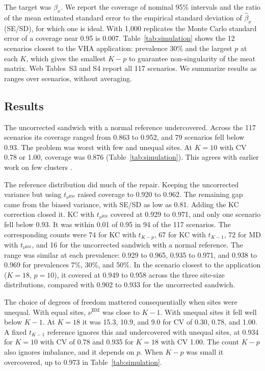 \documentclass[12pt]{article}
\theoremstyle{remark}
\begin{document}
The target was $\beta_x$. We report the coverage of nominal 95\% intervals and
the ratio of the mean estimated standard error to the empirical standard
deviation of $\widehat\beta_x$ (SE/SD), for which one is ideal. With 1{,}000
replicates the Monte Carlo standard error of a coverage near 0.95 is 0.007.
Table~\ref{tab:simulation} shows the 12 scenarios closest to the VHA
application: prevalence 30\% and the largest $p$ at each $K$, which gives the
smallest $K-p$ to guarantee non-singularity of the meat matrix. Web Tables~S3 and S4 report all 117 scenarios. We summarize
results as ranges over scenarios, without averaging.

\subsection{Results}
\label{sec:simresults}

The uncorrected sandwich with a normal reference undercovered. Across the 117
scenarios its coverage ranged from 0.863 to 0.952, and 79 scenarios fell below
0.93. The problem was worst with few and unequal sites. At $K=10$ with CV 0.78 or
1.00, coverage was 0.876 (Table~\ref{tab:simulation}). This agrees with earlier
work on few clusters \citep{mancl2001covariance,liredden2015sandwich}.

The reference distribution did much of the repair. Keeping the uncorrected
variance but using $t_{\nu^{\mathrm{BM}}}$ raised coverage to 0.920 to 0.962. The
remaining gap came from the biased variance, with SE/SD as low as 0.81. Adding
the KC correction closed it. KC with $t_{\nu^{\mathrm{BM}}}$ covered at 0.929 to
0.971, and only one scenario fell below 0.93. It was within 0.01 of 0.95 in 94 of the 117 scenarios. The
corresponding counts were 74 for KC with $t_{K-p}$, 67 for KC with $t_{K-1}$, 72
for MD with $t_{\nu^{\mathrm{BM}}}$, and 16 for the uncorrected sandwich with a
normal reference. The range was similar at each
prevalence: 0.929 to 0.965, 0.935 to 0.971, and 0.938 to 0.969 for prevalences
7\%, 30\%, and 50\%. In the scenario closest to the application ($K=18$,
$p=10$), it covered at 0.949 to 0.958 across the three site-size distributions,
compared with 0.902 to 0.933 for the uncorrected sandwich.

The choice of degrees of freedom mattered consequentially when sites were unequal. With
equal sites, $\nu^{\mathrm{BM}}$ was close to $K-1$. With unequal sites it fell
well below $K-1$. At $K=18$ it was 15.3, 10.9, and 9.0 for CV of 0.30, 0.78, and
1.00. A fixed $t_{K-1}$ reference ignores this and undercovered with unequal
sites, at 0.934 for $K=10$ with CV of 0.78 and 0.935 for $K=18$ with CV 1.00. The
count $K-p$ also ignores imbalance, and it depends on $p$. When $K-p$ was small it
overcovered, up to 0.973 in Table~\ref{tab:simulation}.
\end{document}
